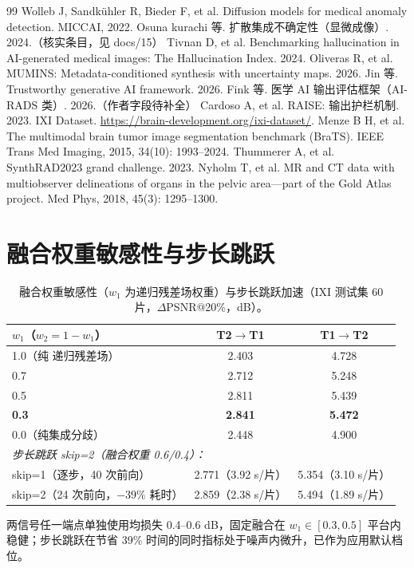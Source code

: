 \documentclass[11pt,a4paper]{ctexart}
\newcommand{\rcrf}{递归残差场}
\begin{document}
\begin{thebibliography}{99}
 Wolleb J, Sandk{\"u}hler R, Bieder F, et al. Diffusion models for medical anomaly detection. MICCAI, 2022.
 Osuna kurachi 等. 扩散集成不确定性（显微成像）. 2024.（核实条目，见 docs/15）
 Tivnan D, et al. Benchmarking hallucination in AI-generated medical images: The Hallucination Index. 2024.
 Oliveras R, et al. MUMINS: Metadata-conditioned synthesis with uncertainty maps. 2026.
 Jin 等. Trustworthy generative AI framework. 2026.
 Fink 等. 医学 AI 输出评估框架（AI-RADS 类）. 2026.（作者字段待补全）
 Cardoso A, et al. RAISE: 输出护栏机制. 2023.
 IXI Dataset. \url{https://brain-development.org/ixi-dataset/}.
 Menze B H, et al. The multimodal brain tumor image segmentation benchmark (BraTS). IEEE Trans Med Imaging, 2015, 34(10): 1993--2024.
 Thummerer A, et al. SynthRAD2023 grand challenge. 2023.
 Nyholm T, et al. MR and CT data with multiobserver delineations of organs in the pelvic area---part of the Gold Atlas project. Med Phys, 2018, 45(3): 1295--1300.

\end{thebibliography}

\appendix

\section{融合权重敏感性与步长跳跃}

\begin{table}[htbp]
\centering\small
\caption{融合权重敏感性（$w_1$ 为递归残差场权重）与步长跳跃加速（IXI 测试集 60 片，$\Delta$PSNR@20\%，dB）。}
\label{tab:weights}
\begin{tabular}{lcc}
\toprule
$w_1$（$w_2=1-w_1$） & T2$\to$T1 & T1$\to$T2 \\
\midrule
1.0（纯 \rcrf） & 2.403 & 4.728 \\
0.7 & 2.712 & 5.248 \\
0.5 & 2.811 & 5.439 \\
\textbf{0.3} & \textbf{2.841} & \textbf{5.472} \\
0.0（纯集成分歧） & 2.448 & 4.900 \\
\midrule
\multicolumn{3}{l}{\emph{步长跳跃 skip=2（融合权重 0.6/0.4）：}} \\
\quad skip=1（逐步，40 次前向） & 2.771（3.92 s/片） & 5.354（3.10 s/片） \\
\quad skip=2（24 次前向，$-39\%$ 耗时） & 2.859（2.38 s/片） & 5.494（1.89 s/片） \\
\bottomrule
\end{tabular}
\end{table}

两信号任一端点单独使用均损失 0.4--0.6 dB，固定融合在 $w_1\in[0.3,0.5]$ 平台内稳健；步长跳跃在节省 39\% 时间的同时指标处于噪声内微升，已作为应用默认档位。
\end{document}
